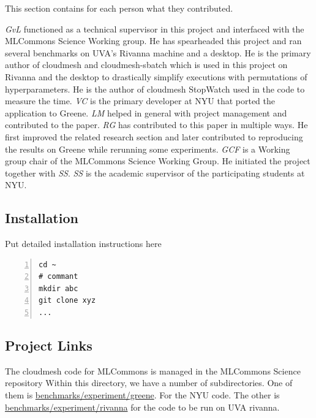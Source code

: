 \documentclass[sigplan,screen]{acmart}
\begin{document}
This section contains for each person what they contributed.

{\em GvL} functioned as a technical supervisor in this project and interfaced with the MLCommons Science Working group. He has spearheaded this project and ran several benchmarks on UVA's Rivanna machine and a desktop. He is the primary author of cloudmesh and cloudmesh-sbatch which is used in this project on Rivanna and the desktop to drastically simplify executions with permutations of hyperparameters. He is the author of cloudmesh StopWatch used in the code to measure the time.
{\em VC} is the primary developer at NYU that ported the application to Greene.  
{\em LM} helped in general with project management and contributed to the paper.
{\em RG} has contributed to this paper in multiple ways. He first improved the related research section and later contributed to reproducing the results on Greene while rerunning some experiments.
{\em GCF} is a Working group chair of the MLCommons Science Working Group. He initiated the project together with {\em SS}. {\em SS} is the academic supervisor of the participating students at NYU.

\subsection{Installation}

Put detailed installation instructions here

{\footnotesize
\begin{Verbatim}[numbers=left,xleftmargin=5mm]
cd ~
# commant
mkdir abc
git clone xyz
...
\end{Verbatim}
}

\subsection{Project Links}


The cloudmesh code for MLCommons is managed in the MLCommons Science repository \cite{github-laszewsk-mlcommons}
Within this directory, we have a number of subdirectories. One of them is \href{https://github.com/laszewsk/mlcommons/tree/main/benchmarks/cloudmask/experiments/rivanna}{benchmarks/experiment/greene}. For the NYU code. The other is \href{https://github.com/laszewsk/mlcommons/tree/main/benchmarks/cloudmask/experiments/rivanna}{benchmarks/experiment/rivanna} for the code to be run on UVA rivanna.
\end{document}
